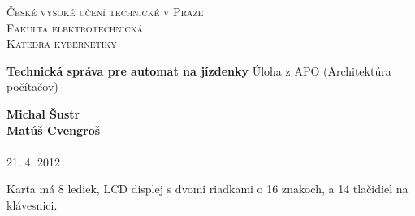 \documentclass[pdftex,12pt,a4paper]{article}
\def \nazovUlohy{Technická správa pre automat na jízdenky}
\def \tema{Úloha z APO (Architektúra počítačov)}
\def \author{\textbf{Michal Šustr} \\ \textbf{Matúš Cvengroš}}
\def \date{21. 4. 2012}
\begin{document}
\begin{center}
	\parbox[s][4cm][s]{10cm}{\scshape \large
	České vysoké učení technické v Praze\\Fakulta elektrotechnická\\Katedra kybernetiky}
	\vskip 2cm {\Huge \bfseries \nazovUlohy}
	\vskip 1cm {\Large \tema}
\end{center}

\vfill

\begin{flushright}
	\author \\
	~\\
	\date
\end{flushright}


\newpage
\pagestyle{fancy}
Karta má 8 lediek, LCD displej s dvomi riadkami o 16 znakoch, a 14 tlačidiel na klávesnici.
\end{document}
